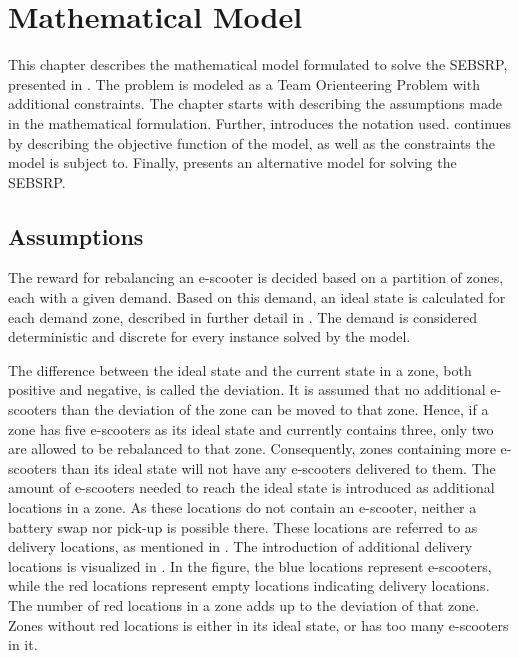 \chapter{Mathematical Model}\label{math_model}
This chapter describes the mathematical model formulated to solve the SEBSRP, presented in . The problem is modeled as a Team Orienteering Problem with additional constraints. The chapter starts with  describing the assumptions made in the mathematical formulation. Further,  introduces the notation used.  continues by describing the objective function of the model, as well as the constraints the model is subject to. Finally,  presents an alternative model for solving the SEBSRP. 

\section{Assumptions}\label{assumptions}
The reward for rebalancing an e-scooter is decided based on a partition of zones, each with a given demand. Based on this demand, an ideal state is calculated for each demand zone, described in further detail in . The demand is considered deterministic and discrete for every instance solved by the model. 

The difference between the ideal state and the current state in a zone, both positive and negative, is called the deviation. It is assumed that no additional e-scooters than the deviation of the zone can be moved to that zone. Hence, if a zone has five e-scooters as its ideal state and currently contains three, only two are allowed to be rebalanced to that zone. Consequently, zones containing more e-scooters than its ideal state will not have any e-scooters delivered to them. The amount of e-scooters needed to reach the ideal state is introduced as additional locations in a zone. As these locations do not contain an e-scooter, neither a battery swap nor pick-up is possible there. These locations are referred to as delivery locations, as mentioned in . The introduction of additional delivery locations is visualized in . In the figure, the blue locations represent e-scooters, while the red locations represent empty locations indicating delivery locations. The number of red locations in a zone adds up to the deviation of that zone. Zones without red locations is either in its ideal state, or has too many e-scooters in it.

